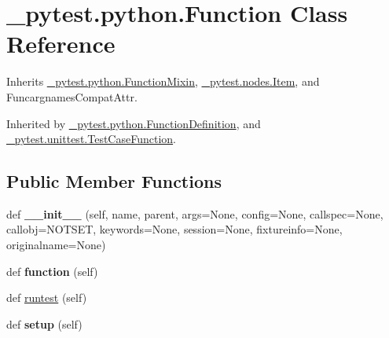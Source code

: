 \hypertarget{class__pytest_1_1python_1_1_function}{}\section{\+\_\+pytest.\+python.\+Function Class Reference}
\label{class__pytest_1_1python_1_1_function}


Inherits \hyperlink{class__pytest_1_1python_1_1_function_mixin}{\+\_\+pytest.\+python.\+Function\+Mixin}, \hyperlink{class__pytest_1_1nodes_1_1_item}{\+\_\+pytest.\+nodes.\+Item}, and Funcargnames\+Compat\+Attr.



Inherited by \hyperlink{class__pytest_1_1python_1_1_function_definition}{\+\_\+pytest.\+python.\+Function\+Definition}, and \hyperlink{class__pytest_1_1unittest_1_1_test_case_function}{\+\_\+pytest.\+unittest.\+Test\+Case\+Function}.

\subsection*{Public Member Functions}
\begin{DoxyCompactItemize}
\item 
\mbox{\label{class__pytest_1_1python_1_1_function_a738656db2071fb26ece49ff691881a2c}} 
def {\bfseries \+\_\+\+\_\+init\+\_\+\+\_\+} (self, name, parent, args=None, config=None, callspec=None, callobj=N\+O\+T\+S\+ET, keywords=None, session=None, fixtureinfo=None, originalname=None)
\item 
\mbox{\label{class__pytest_1_1python_1_1_function_a3420f986fcc34cfa7bce6772dd0bb8f8}} 
def {\bfseries function} (self)
\item 
def \hyperlink{class__pytest_1_1python_1_1_function_af111099922380430d9eb9f04fe2a4ccc}{runtest} (self)
\item 
\mbox{\label{class__pytest_1_1python_1_1_function_a849473d59f0c9ef99ac8907ca52471ae}} 
def {\bfseries setup} (self)
\end{DoxyCompactItemize}
